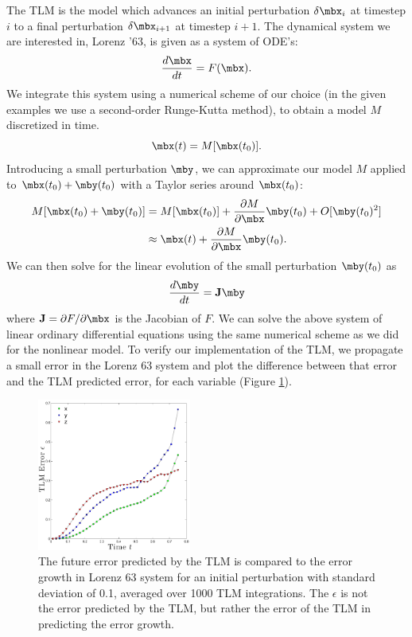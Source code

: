 The TLM is the model which advances an initial perturbation $\delta \mbx_{i}$ at timestep $i$ to a final perturbation $\delta \mbx_{i+1}$ at timestep $i+1$.
The dynamical system we are interested in, Lorenz '63, is given as a system of ODE's:
\[ \frac{d\mbx}{dt} = F(\mbx) .\]
We integrate this system using a numerical scheme of our choice (in the given examples we use a second-order Runge-Kutta method), to obtain a model $M$ discretized in time.
\[ \mbx(t) = M[ \mbx(t_0) ] .\]
Introducing a small perturbation $\mby$, we can approximate our model $M$ applied to $\mbx(t_0) + \mby(t_0)$ with a Taylor series around $\mbx(t_0)$:
\begin{align*} M[ \mbx(t_0) + \mby(t_0) ] &= M [ \mbx(t_0) ] + \frac{\partial M}{\partial \mbx} \mby(t_0) + O [ \mby(t_0) ^2 ]\\ &\approx \mbx(t) + \frac{\partial M}{\partial \mbx} \mby(t_0) .\end{align*}
We can then solve for the linear evolution of the small perturbation $\mby(t_0)$ as 
\begin{equation} \frac{d\mby }{dt } = \mathbf{J} \mby \label{eq:ODETLM} \end{equation}
where $\mathbf{J} = \partial F / \partial \mbx$ is the Jacobian of $F$.
We can solve the above system of linear ordinary differential equations using the same numerical scheme as we did for the nonlinear model.
To verify our implementation of the TLM, we propagate a small error in the Lorenz 63 system and plot the difference between that error and the TLM predicted error, for each variable (Figure \ref{fig:TLMverification}).

\begin{figure}[h!]
  \centering
  \includegraphics[width=0.45\textwidth]{figures/TLM-verification003_noname.pdf}
  \caption[The future error predicted by the TLM is compared to the error growth in Lorenz 63 system for an initial perturbation with standard deviation of 0.1, averaged over 1000 TLM integrations]{
    The future error predicted by the TLM is compared to the error growth in Lorenz 63 system for an initial perturbation with standard deviation of 0.1, averaged over 1000 TLM integrations.
    The $\epsilon$ is not the error predicted by the TLM, but rather the error of the TLM in predicting the error growth.
  }
  \label{fig:TLMverification}
\end{figure}

